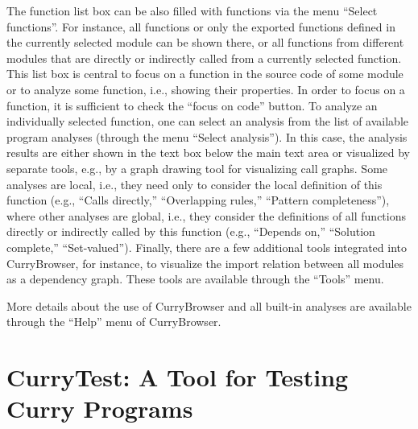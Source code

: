 \documentclass[11pt,fleqn]{article}
\newcommand{\cb}{CurryBrowser\xspace}
\begin{document}
The function list box can be also filled with functions
via the menu ``Select functions''. For instance, all functions
or only the exported functions defined in the currently selected
module can be shown there, or all functions from different modules
that are directly or indirectly called from
a currently selected function.
This list box is central to focus on a function in the
source code of some module or to analyze some function,
i.e., showing their properties. In order to focus on a function,
it is sufficient to check the ``focus on code'' button.
To analyze an individually selected function, one can
select an analysis from the list of available program analyses
(through the menu ``Select analysis'').
In this case, the analysis results are either shown
in the text box below the main text area
or visualized by separate tools, e.g., by a graph drawing tool for
visualizing call graphs.
Some analyses are local, i.e., they need only to consider the local definition
of this function (e.g., ``Calls directly,'' ``Overlapping rules,''
``Pattern completeness''),
where other analyses are global, i.e.,
they consider the definitions of all functions directly or indirectly called
by this function (e.g., ``Depends on,'' ``Solution complete,''
``Set-valued'').
%
Finally, there are a few additional tools integrated into \cb,
for instance, to visualize the import relation between all modules
as a dependency graph. These tools are available through the ``Tools'' menu.

More details about the use of \cb and all built-in analyses
are available through the ``Help'' menu of \cb.


\newpage

\section{CurryTest: A Tool for Testing Curry Programs}
\label{sec-currytest}
\end{document}
